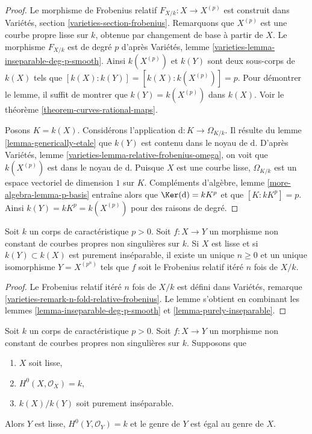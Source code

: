 \begin{proof}
Le morphisme de Frobenius relatif $F_{X/k} : X \to X^{(p)}$ est construit dans Variétés, section \ref{varieties-section-frobenius}. Remarquons que $X^{(p)}$ est une courbe propre lisse sur $k$, obtenue par changement de base à partir de $X$. Le morphisme $F_{X/k}$ est de degré $p$ d'après Variétés, lemme \ref{varieties-lemma-inseparable-deg-p-smooth}. Ainsi $k(X^{(p)})$ et $k(Y)$ sont deux sous-corps de $k(X)$ tels que $[k(X) : k(Y)] = [k(X) : k(X^{(p)})] = p$. Pour démontrer le lemme, il suffit de montrer que $k(Y) = k(X^{(p)})$ dans $k(X)$. Voir le théorème \ref{theorem-curves-rational-maps}.

\medskip\noindent
Posons $K = k(X)$. Considérons l'application $\text{d} : K \to \Omega_{K/k}$. Il résulte du lemme \ref{lemma-generically-etale} que $k(Y)$ est contenu dans le noyau de $\text{d}$. D'après Variétés, lemme \ref{varieties-lemma-relative-frobenius-omega}, on voit que $k(X^{(p)})$ est dans le noyau de $\text{d}$. Puisque $X$ est une courbe lisse, $\Omega_{K/k}$ est un espace vectoriel de dimension $1$ sur $K$. Compléments d'algèbre, lemme \ref{more-algebra-lemma-p-basis} entraîne alors que $\Ker(\text{d}) = kK^p$ et que $[K : kK^p] = p$. Ainsi $k(Y) = kK^p = k(X^{(p)})$ pour des raisons de degré.
\end{proof}

\begin{lemma}
\label{lemma-purely-inseparable-smooth}
Soit $k$ un corps de caractéristique $p > 0$. Soit $f : X \to Y$ un morphisme non constant de courbes propres non singulières sur $k$. Si $X$ est lisse et si $k(Y) \subset k(X)$ est purement inséparable, il existe un unique $n \geq 0$ et un unique isomorphisme $Y = X^{(p^n)}$ tels que $f$ soit le Frobenius relatif itéré $n$ fois de $X/k$.
\end{lemma}

\begin{proof}
Le Frobenius relatif itéré $n$ fois de $X/k$ est défini dans Variétés, remarque \ref{varieties-remark-n-fold-relative-frobenius}. Le lemme s'obtient en combinant les lemmes \ref{lemma-inseparable-deg-p-smooth} et \ref{lemma-purely-inseparable}.
\end{proof}

\begin{lemma}
\label{lemma-purely-inseparable-smooth-genus}
Soit $k$ un corps de caractéristique $p > 0$. Soit $f : X \to Y$ un morphisme non constant de courbes propres non singulières sur $k$. Supposons que \begin{enumerate} \item $X$ soit lisse, \item $H^0(X, \mathcal{O}_X) = k$, \item $k(X)/k(Y)$ soit purement inséparable. \end{enumerate} Alors $Y$ est lisse, $H^0(Y, \mathcal{O}_Y) = k$ et le genre de $Y$ est égal au genre de $X$.
\end{lemma}

